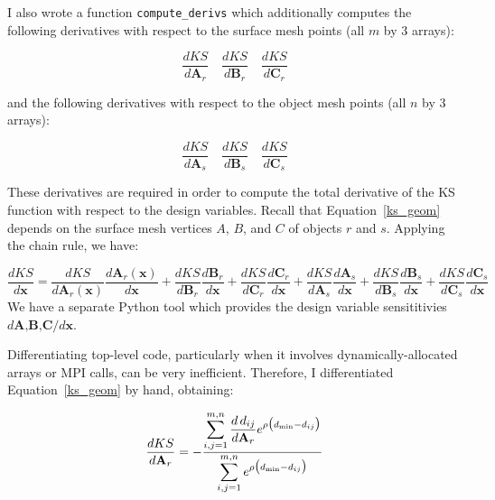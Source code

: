 \documentclass[11pt,letterpaper]{article}
\begin{document}
\qquad I also wrote a function \texttt{compute\_derivs} which additionally computes the following derivatives with respect to the surface mesh points (all $m$ by 3 arrays):

\begin{equation}
  \frac{dKS}{d\textbf{A}_r} \, \, \, \, \, \, \frac{dKS}{d\textbf{B}_r} \, \, \, \, \, \, \frac{dKS}{d\textbf{C}_r}
\end{equation}

and the following derivatives with respect to the object mesh points (all $n$ by 3 arrays):

\begin{equation}
  \frac{dKS}{d\textbf{A}_s} \, \, \, \, \, \, \frac{dKS}{d\textbf{B}_s} \, \, \, \, \, \, \frac{dKS}{d\textbf{C}_s}
\end{equation}

These derivatives are required in order to compute the total derivative of the KS function with respect to the design variables.
Recall that Equation~\ref{ks_geom} depends on the surface mesh vertices $A$, $B$, and $C$ of objects $r$ and $s$.
Applying the chain rule, we have:

\begin{equation}
  \frac{dKS}{d\textbf{x}} = \frac{dKS}{d\textbf{A}_r(\textbf{x})} \frac{d\textbf{A}_r(\textbf{x})}{d\textbf{x}} +
                            \frac{dKS}{d\textbf{B}_r} \frac{d\textbf{B}_r}{d\textbf{x}} +
                            \frac{dKS}{d\textbf{C}_r} \frac{d\textbf{C}_r}{d\textbf{x}} +
                            \frac{dKS}{d\textbf{A}_s} \frac{d\textbf{A}_s}{d\textbf{x}} +
                            \frac{dKS}{d\textbf{B}_s} \frac{d\textbf{B}_s}{d\textbf{x}} +
                            \frac{dKS}{d\textbf{C}_s} \frac{d\textbf{C}_s}{d\textbf{x}}
\end{equation}
We have a separate Python tool which provides the design variable sensititivies $d\textbf{A,B,C}/d\textbf{x}$.


\qquad Differentiating top-level code, particularly when it involves dynamically-allocated arrays or MPI calls, can be very inefficient.
Therefore, I differentiated Equation~\ref{ks_geom} by hand, obtaining:

\begin{equation}
  \frac{dKS}{d\textbf{A}_r} = -\frac{\mathlarger{\sum_{i,j=1}^{m,n} \frac{d\,d_{ij}}{d\textbf{A}_r}e^{\rho\big(d_\text{min}-d_{ij}\big)}}}
  {\mathlarger{\sum_{i,j=1}^{m,n} e^{\rho\big(d_\text{min}-d_{ij}\big)}}}
\end{equation}
\end{document}
